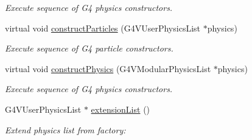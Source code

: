\begin{DoxyCompactItemize}
\begin{DoxyCompactList}\small\item\em Execute sequence of G4 physics constructors. \end{DoxyCompactList}\item 
virtual void \hyperlink{class_d_d4hep_1_1_simulation_1_1_geant4_physics_list_action_sequence_a4061788d8d84ae4bad79f7f8e53ec14b}{construct\+Particles} (G4\+V\+User\+Physics\+List $\ast$physics)
\begin{DoxyCompactList}\small\item\em Execute sequence of G4 particle constructors. \end{DoxyCompactList}\item 
virtual void \hyperlink{class_d_d4hep_1_1_simulation_1_1_geant4_physics_list_action_sequence_a6f06380a0f50652f86d496ec5ab46005}{construct\+Physics} (G4\+V\+Modular\+Physics\+List $\ast$physics)
\begin{DoxyCompactList}\small\item\em Execute sequence of G4 physics constructors. \end{DoxyCompactList}\item 
G4\+V\+User\+Physics\+List $\ast$ \hyperlink{class_d_d4hep_1_1_simulation_1_1_geant4_physics_list_action_sequence_a51078548bbd59fa3cb1447d2b2c6e2fb}{extension\+List} ()
\begin{DoxyCompactList}\small\item\em Extend physics list from factory\+: \end{DoxyCompactList}\end{DoxyCompactItemize}
